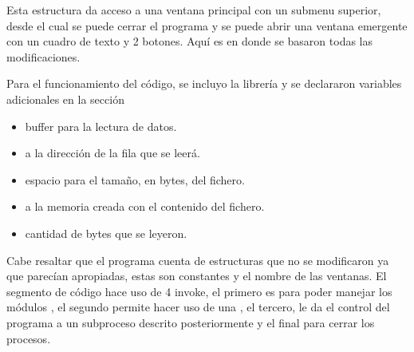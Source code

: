 Esta estructura da acceso a una ventana principal con un submenu superior, desde
el cual se puede cerrar el programa y se puede abrir una ventana emergente con un
cuadro de texto y 2 botones. Aquí es en donde se basaron todas las modificaciones.


Para el funcionamiento del código, se incluyo la librería  y se
declararon variables adicionales en la sección 


\begin{itemize}
    \item {} buffer para la lectura de datos.

    \item {}  a la dirección de la fila que se
        leerá.

    \item {} espacio para el tamaño, en bytes, del fichero.

    \item {}  a la memoria creada con el contenido
        del fichero.

    \item {} cantidad de bytes que se leyeron.

\end{itemize}



Cabe resaltar que el programa cuenta de estructuras que no se modificaron ya que
parecían apropiadas, estas son constantes y el nombre de las ventanas. El segmento
 de código hace uso de 4 invoke, el primero es para poder manejar los módulos
 , el segundo  permite hacer
 uso de una , el tercero,  le da el control del
 programa a un subproceso descrito posteriormente y el final para cerrar los procesos.



